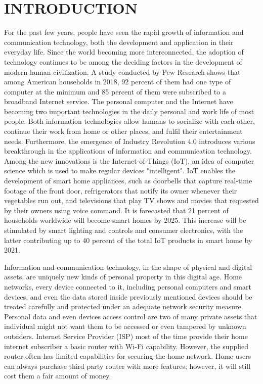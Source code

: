 \documentclass[../index.tex]{subfiles}
\begin{document}
\chapter{INTRODUCTION}
\setcounter{page}{1}

For the past few years, people have seen the rapid growth of information and communication technology, both the development and application in their everyday life. Since the world becoming more interconnected, the adoption of technology continues to be among the deciding factors in the development of modern human civilization. A study conducted by Pew Research shows that among American households in 2018, 92 percent of them had one type of computer at the minimum and 85 percent of them were subscribed to a broadband Internet service. The personal computer and the Internet have becoming two important technologies in the daily personal and work life of most people. Both information technologies allow humans to socialize with each other, continue their work from home or other places, and fulfil their entertainment needs. Furthermore, the emergence of Industry Revolution 4.0 introduces various breakthrough in the applications of information and communication technology. Among the new innovations is the Internet-of-Things (IoT), an idea of computer science which is used to make regular devices "intelligent". IoT enables the development of smart home appliances, such as doorbells that capture real-time footage of the front door, refrigerators that notify its owner whenever their vegetables run out, and televisions that play TV shows and movies that requested by their owners using voice command. It is forecasted that 21 percent of households worldwide will become smart homes by 2025. This increase will be stimulated by smart lighting and controls and consumer electronics, with the latter contributing up to 40 percent of the total IoT products in smart home by 2021.

Information and communication technology, in the shape of physical and digital assets, are uniquely new kinds of personal property in this digital age. Home networks, every device connected to it, including personal computers and smart devices, and even the data stored inside previously mentioned devices should be treated carefully and protected under an adequate network security measure. Personal data and even devices access control are two of many private assets that individual might not want them to be accessed or even tampered by unknown outsiders. Internet Service Provider (ISP) most of the time provide their home internet subscriber a basic router with Wi-Fi capability. However, the supplied router often has limited capabilities for securing the home network. Home users can always purchase third party router with more features; however, it will still cost them a fair amount of money.
\end{document}
